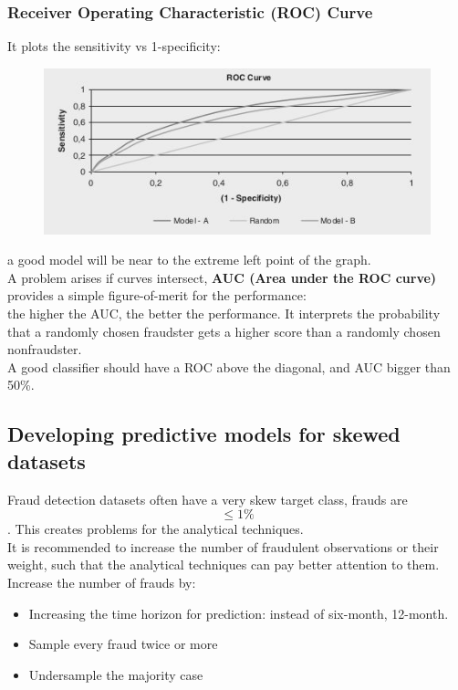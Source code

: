         \subsubsection{Receiver Operating Characteristic (ROC) Curve}
            It plots the sensitivity vs 1-specificity:
            \begin{figure}[ht!]
                \centering
                \includegraphics[width=0.6\linewidth]{lecture_16/roc.png}
            \end{figure}
            a good model will be near to the extreme left point of the graph.\\
            A problem arises if curves intersect, \textbf{AUC (Area under the ROC curve)} provides a simple figure-of-merit for the performance:\\
            the higher the AUC, the better the performance. It interprets the probability that a randomly chosen fraudster gets a higher score than a randomly chosen nonfraudster.\\
            A good classifier should have a ROC above the diagonal, and AUC bigger than 50\%.
    \subsection{Developing predictive models for skewed datasets}
        Fraud detection datasets often have a very skew target class, frauds are $$\leq 1\%$$. This creates problems for the analytical techniques.\\
        It is recommended to increase the number of fraudulent observations or their weight, such that the analytical techniques can pay better attention to them.\\
        Increase the number of frauds by:
        \begin{itemize}
            \item Increasing the time horizon for prediction: instead of six-month, 12-month.
            \item Sample every fraud twice or more 
            \item Undersample the majority case
        \end{itemize}
